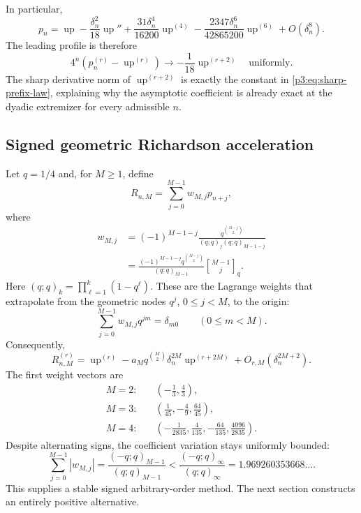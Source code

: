 \documentclass[11pt,oneside]{article}
\numberwithin{equation}{section}
\theoremstyle{definition}
\theoremstyle{remark}
\newcommand{\Up}{\operatorname{up}}
\newcommand{\qbinom}[3]{\genfrac{[}{]}{0pt}{}{#1}{#2}_{#3}}
\begin{document}
In particular,
\begin{equation}
 p_n=\Up-\frac{\delta_n^2}{18}\Up''
 +\frac{31\delta_n^4}{16200}\Up^{(4)}
 -\frac{2347\delta_n^6}{42865200}\Up^{(6)}
 +O(\delta_n^8).
 \label{p3:eq:first-expansion}
\end{equation}
The leading profile is therefore
\begin{equation}
 4^n(p_n^{(r)}-\Up^{(r)})
 \longrightarrow-\frac1{18}\Up^{(r+2)}
 \quad\text{uniformly}.
 \label{p3:eq:leading-profile}
\end{equation}
The sharp derivative norm of $\Up^{(r+2)}$ is exactly the constant in
\cref{p3:eq:sharp-prefix-law}, explaining why the asymptotic coefficient is already exact
at the dyadic extremizer for every admissible $n$.

\subsection{Signed geometric Richardson acceleration}

Let $q=1/4$ and, for $M\ge1$, define
\begin{equation}
 R_{n,M}=\sum_{j=0}^{M-1}w_{M,j}p_{n+j},
 \label{p3:eq:richardson-combination}
\end{equation}
where
\begin{equation}
\begin{aligned}
 w_{M,j}
 &=(-1)^{M-1-j}
 \frac{q^{\binom{M-j}{2}}}{(q;q)_j(q;q)_{M-1-j}}\\
 &=\frac{(-1)^{M-1-j}q^{\binom{M-j}{2}}}{(q;q)_{M-1}}
 \qbinom{M-1}{j}{q}.
\end{aligned}
 \label{p3:eq:richardson-weights}
\end{equation}
Here $(q;q)_k=\prod_{\ell=1}^k(1-q^\ell)$.  These are the Lagrange weights that
extrapolate from the geometric nodes $q^j$, $0\le j<M$, to the origin:
\begin{equation}
 \sum_{j=0}^{M-1}w_{M,j}q^{jm}=\delta_{m0}
 \qquad(0\le m<M).
 \label{p3:eq:richardson-moments}
\end{equation}
Consequently,
\begin{equation}
 R_{n,M}^{(r)}
 =\Up^{(r)}-a_Mq^{\binom M2}\delta_n^{2M}\Up^{(r+2M)}
 +O_{r,M}(\delta_n^{2M+2}).
 \label{p3:eq:richardson-leading}
\end{equation}
The first weight vectors are
\begin{align*}
 M=2:&\quad\left(-\frac13,\frac43\right),\\
 M=3:&\quad\left(\frac1{45},-\frac49,\frac{64}{45}\right),\\
 M=4:&\quad\left(-\frac1{2835},\frac4{135},-\frac{64}{135},\frac{4096}{2835}\right).
\end{align*}
Despite alternating signs, the coefficient variation stays uniformly bounded:
\begin{equation}
 \sum_{j=0}^{M-1}|w_{M,j}|
 =\frac{(-q;q)_{M-1}}{(q;q)_{M-1}}
 <\frac{(-q;q)_\infty}{(q;q)_\infty}
 =1.969260353668\ldots.
 \label{p3:eq:richardson-stability}
\end{equation}
This supplies a stable signed arbitrary-order method.  The next section constructs an
entirely positive alternative.
\end{document}
